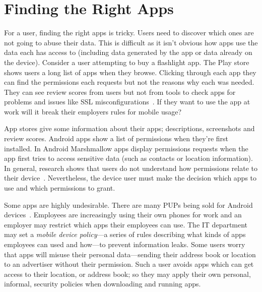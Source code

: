 \documentclass[thesis.tex]{subfiles}
\begin{document}
\section{Finding the Right Apps}

For a user, finding the right apps is tricky.  Users need to discover
which ones are not going to abuse their data.  This is difficult as it
isn't obvious how apps use the data each has access to (including data
generated by the app or data already on the device).  Consider a user
attempting to buy a flashlight app.  The Play store shows users a long
list of apps when they browse.  Clicking through each app they can
find the permissions each requests but not the reasons why each was
needed.  They can see review scores from users but not from tools to
check apps for problems and issues like SSL
misconfigurations~\cite{fahl_why_2012}.  If they want to use the app
at work will it break their employers rules for mobile usage?

App stores give some information about their apps; descriptions,
screenshots and review scores.  Android apps show a list of
permissions when they're first installed.  In Android Marshmallow apps
display permissions requests when the app first tries to access
sensitive data (such as contacts or location information).  In
general, research shows that users do not understand how permissions
relate to their device~\cite{felt_android_2012,thompson_when_2013}.
Nevertheless, the device user must make the decision which apps to use
and which permissions to grant.

Some apps are highly undesirable.  There are many \acp{PUP} being sold
for Android
devices~\cite{truong_company_2014,vanja_svajcer_classifying_2013}.
Employees are increasingly using their own phones for work and an
employer may restrict which apps their employees can use.  The IT
department may set a \emph{mobile device policy}---a series of rules
describing what kinds of apps employees can used and how---to prevent
information leaks.  Some users worry that apps will misuse their
personal data---sending their address book or location to an
advertiser without their permission.  Such a user avoids apps which
can get access to their location, or address book; so they may apply their own
personal, informal, security policies when downloading and running apps.
\end{document}
